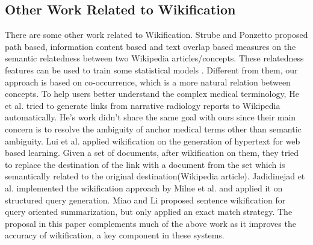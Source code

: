 \subsection{Other Work Related to Wikification}
There are some other work related to Wikification.
Strube and Ponzetto \cite{StrubeP06} proposed path based,
information content based and text overlap based measures on
the semantic relatedness between two Wikipedia articles/concepts.
These relatedness features can be used to train some
statistical models \cite{kulkarni2009collective,RatinovRDA11}.
Different from them, our approach is based on co-occurrence,
which is a more natural relation between concepts.
To help users better understand the complex medical terminology,
He et al. \cite{HeRSOQ11} tried to
generate links from narrative radiology reports to Wikipedia automatically.
He's work didn't share the same goal with ours since their main concern is
to resolve the ambiguity of anchor medical terms other than semantic ambiguity.
Lui et al. \cite{lui2011generation} applied wikification on
the generation of hypertext for web based learning.
Given a set of documents, after wikification on them,
they tried to replace the destination of the link with
a document from the set which is semantically
related to the original destination(Wikipedia article).
Jadidinejad et al. \cite{jadidinejad2009query} implemented the wikification
approach by Milne et al. \cite{milne2008learning} and applied it
on structured query generation.
Miao and Li proposed sentence wikification for query
oriented summarization, but only applied an exact match strategy.
The proposal in this paper complements much of the above
work as it improves the accuracy of wikification, a key component in
these systems.




